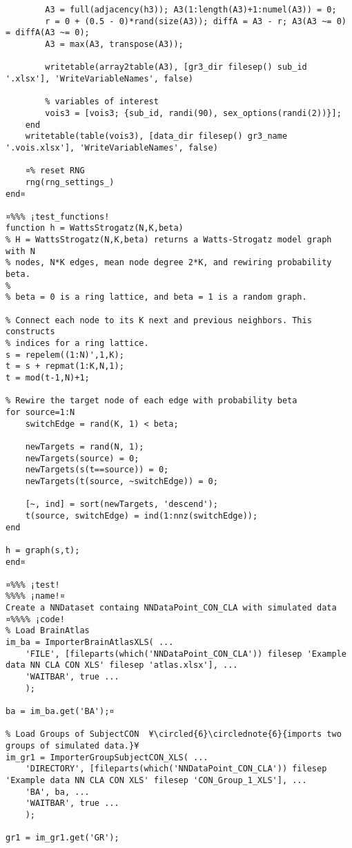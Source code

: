 \documentclass{tufte-handout}
\begin{document}
\begin{lstlisting}
        A3 = full(adjacency(h3)); A3(1:length(A3)+1:numel(A3)) = 0;
        r = 0 + (0.5 - 0)*rand(size(A3)); diffA = A3 - r; A3(A3 ~= 0) = diffA(A3 ~= 0);
        A3 = max(A3, transpose(A3));

        writetable(array2table(A3), [gr3_dir filesep() sub_id '.xlsx'], 'WriteVariableNames', false)

        % variables of interest
        vois3 = [vois3; {sub_id, randi(90), sex_options(randi(2))}];
    end
    writetable(table(vois3), [data_dir filesep() gr3_name '.vois.xlsx'], 'WriteVariableNames', false)

    ¤% reset RNG
    rng(rng_settings_)
end¤

¤%%% ¡test_functions!
function h = WattsStrogatz(N,K,beta)
% H = WattsStrogatz(N,K,beta) returns a Watts-Strogatz model graph with N
% nodes, N*K edges, mean node degree 2*K, and rewiring probability beta.
%
% beta = 0 is a ring lattice, and beta = 1 is a random graph.

% Connect each node to its K next and previous neighbors. This constructs
% indices for a ring lattice.
s = repelem((1:N)',1,K);
t = s + repmat(1:K,N,1);
t = mod(t-1,N)+1;

% Rewire the target node of each edge with probability beta
for source=1:N
    switchEdge = rand(K, 1) < beta;
    
    newTargets = rand(N, 1);
    newTargets(source) = 0;
    newTargets(s(t==source)) = 0;
    newTargets(t(source, ~switchEdge)) = 0;
    
    [~, ind] = sort(newTargets, 'descend');
    t(source, switchEdge) = ind(1:nnz(switchEdge));
end

h = graph(s,t);
end¤

¤%%% ¡test! 
%%%% ¡name!¤
Create a NNDataset containg NNDataPoint_CON_CLA with simulated data
¤%%%% ¡code!
% Load BrainAtlas
im_ba = ImporterBrainAtlasXLS( ...
    'FILE', [fileparts(which('NNDataPoint_CON_CLA')) filesep 'Example data NN CLA CON XLS' filesep 'atlas.xlsx'], ...
    'WAITBAR', true ...
    );

ba = im_ba.get('BA');¤

% Load Groups of SubjectCON  ¥\circled{6}\circlednote{6}{imports two groups of simulated data.}¥
im_gr1 = ImporterGroupSubjectCON_XLS( ...
    'DIRECTORY', [fileparts(which('NNDataPoint_CON_CLA')) filesep 'Example data NN CLA CON XLS' filesep 'CON_Group_1_XLS'], ...
    'BA', ba, ...
    'WAITBAR', true ...
    );

gr1 = im_gr1.get('GR');


\end{lstlisting}
\end{document}
